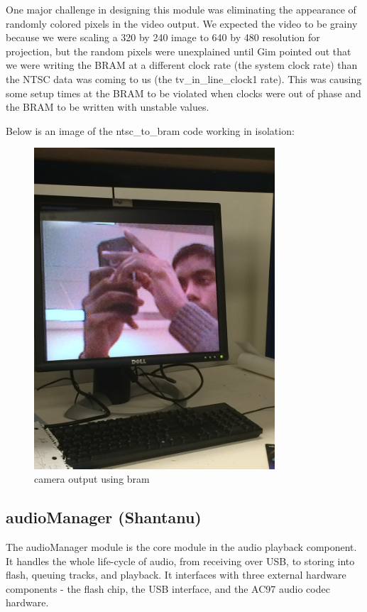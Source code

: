 \documentclass{article}
\begin{document}
One major challenge in designing this module was eliminating the appearance of randomly colored pixels in the video output.
We expected the video to be grainy because we were scaling a 320 by 240 image to 640 by 480 resolution for projection,
but the random pixels were unexplained until Gim pointed out that we were writing the BRAM at a different clock rate (the system clock rate) than the NTSC data was coming to us (the tv\_in\_line\_clock1 rate).
This was causing some setup times at the BRAM to be violated when clocks were out of phase and the BRAM to be written with unstable values.

Below is an image of the ntsc\_to\_bram code working in isolation:
\begin{center}
\begin{figure}[H]
\label{fig:ntsc_to_bram}
\caption{camera output using bram}
\centering
\includegraphics[width=0.8\textwidth, angle=270]{./img/ntsc-complete}
\end{figure}
\end{center}

\subsection{audioManager (Shantanu)}
The audioManager module is the core module in the audio playback component.
It handles the whole life-cycle of audio, from receiving over USB, to storing into flash, queuing tracks, and playback.
It interfaces with three external hardware components - the flash chip, the USB interface, and the AC97 audio codec hardware.
\end{document}
